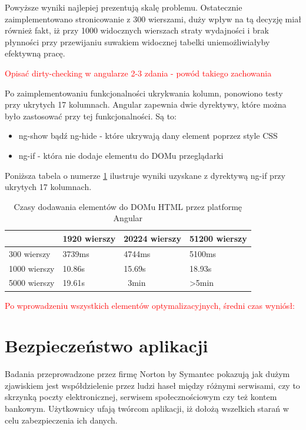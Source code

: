 \documentclass[a4paper,12pt,twoside]{article}
\begin{document}
Powyższe wyniki najlepiej prezentują skalę problemu. Ostatecznie zaimplementowano
stronicowanie z 300 wierszami, duży wpływ na tą decyzję miał również fakt, iż
przy 1000 widocznych wierszach straty wydajności i brak płynności przy przewijaniu
suwakiem widocznej tabelki uniemożliwiałyby efektywną pracę.

\textcolor{red}{Opisać dirty-checking w angularze 2-3 zdania - powód takiego zachowania}

Po zaimplementowaniu funkcjonalności ukrykwania kolumn, ponowiono testy przy ukrytych 17 kolumnach. Angular zapewnia dwie dyrektywy, które można było zastosować przy tej funkcjonalności. Są to:
\begin{itemize}
\item ng-show bądź ng-hide - które ukrywają dany element poprzez style CSS
\item ng-if - która nie dodaje elementu do DOMu przeglądarki
\end{itemize}

Poniższa tabela o numerze \ref{table:tableRenderNgIf} ilustruje wyniki uzyskane z dyrektywą ng-if przy ukrytych 17 kolumnach.
\begin{table} [H]
\begin{tabular}{| p{3cm} | p{3cm} | p{3cm} | p{3cm}|}
\hline
& 1920 wierszy &  20224 wierszy & 51200 wierszy\\ 
\hline
300 wierszy& 3739ms& 4744ms& 5100ms\\ \hline  
1000 wierszy& 10.86s & 15.69s& 18.93s\\ \hline  
5000 wierszy& 19.61s& ~3min& >5min\\ \hline  
\end{tabular}
\caption{Czasy dodawania elementów do DOMu HTML przez platformę Angular}
\label{table:tableRenderNgIf}
\end{table}

\textcolor{red}{Po wprowadzeniu wszystkich elementów optymalizacyjnych, średni czas 
wyniósł: }

\newpage
\section{Bezpieczeństwo aplikacji}  
Badania przeprowadzone przez firmę Norton by Symantec \cite{nortonSec}
pokazują jak dużym zjawiskiem jest współdzielenie przez ludzi haseł między różnymi serwisami, czy to
skrzynką poczty elektronicznej, serwisem społecznościowym czy też kontem bankowym.
Użytkownicy ufają twórcom aplikacji, iż dołożą wszelkich starań w celu zabezpieczenia ich 
danych. 
\end{document}
